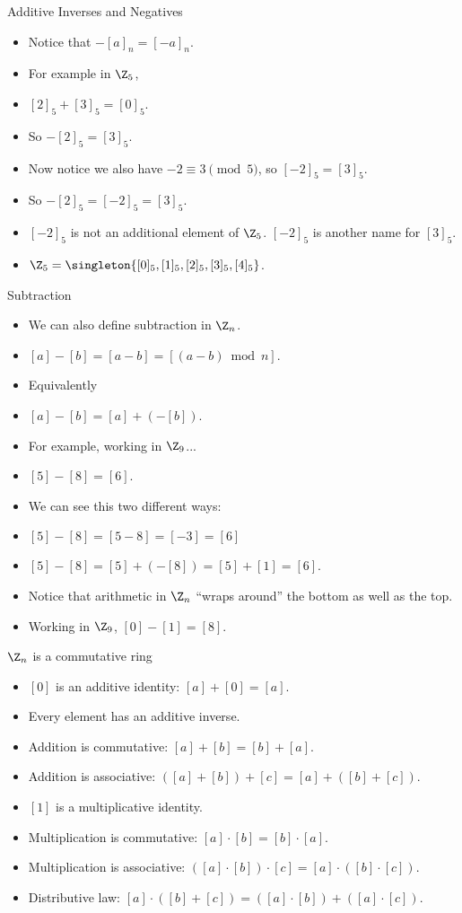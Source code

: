 \documentclass[handout]{beamer}
\begin{document}
\begin{frame}{Additive Inverses and Negatives}
\begin{itemize}
  \item Notice that $-[a]_n = [-a]_n$.
  \item For example in $\Z_5$,
  \item $[2]_5 + [3]_5 = [0]_5$.
  \item So $-[2]_5 = [3]_5$.
  \item Now notice we also have $-2 \equiv 3 \pmod 5$, so $[-2]_5 = [3]_5$.
  \item So $-[2]_5 = [-2]_5 = [3]_5$.
  \item $[-2]_5$ is not an additional element of $\Z_5$. $[-2]_5$ is another name for $[3]_5$.
  \item $\Z_5=\singleton{[0]_5, [1]_5, [2]_5, [3]_5, [4]_5}$.
\end{itemize}
\end{frame}

\begin{frame}{Subtraction}
\begin{itemize}
  \item We can also define subtraction in $\Z_n$.
  \item $[a] - [b] = [a-b] = [(a-b) \bmod n]$.
  \item Equivalently
  \item $[a] - [b] = [a] + (-[b])$.
  \item For example, working in $\Z_9$...
  \item $[5] - [8] = [6]$.
  \item We can see this two different ways:
  \item $[5]-[8] = [5-8] = [-3] = [6]$
  \item $[5] - [8] = [5] + (-[8]) = [5] + [1] = [6]$.
  \item Notice that arithmetic in $\Z_n$ ``wraps around'' the bottom as well as the top.
  \item Working in $\Z_9$, $[0] - [1] = [8]$.
\end{itemize}
\end{frame}

\begin{frame}{$\Z_n$ is a commutative ring}
\begin{itemize}
  \item $[0]$ is an additive identity: $[a] + [0] = [a]$.
  \item Every element has an additive inverse.
  \item Addition is commutative: $[a]+[b]=[b]+[a]$.
  \item Addition is associative: $([a]+[b])+[c]=[a]+([b]+[c])$.
  \item $[1]$ is a multiplicative identity.
  \item Multiplication is commutative: $[a]\cdot[b]=[b]\cdot[a]$.
  \item Multiplication is associative: $([a]\cdot[b])\cdot[c]=[a]\cdot([b]\cdot[c])$.
  \item Distributive law: $[a]\cdot([b]+[c]) = ([a]\cdot[b])+([a]\cdot [c])$.
\end{itemize}
\end{frame}
\end{document}
